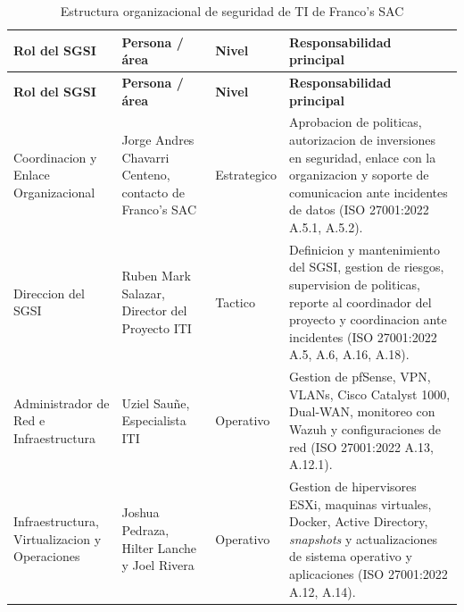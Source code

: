 \documentclass[11pt, a4paper, oneside]{report}
\begin{document}
\begin{xltabular}{\textwidth}{@{}|L{3.4cm}|L{2.6cm}|L{1.6cm}|X|@{}}
\caption{Estructura organizacional de seguridad de TI de Franco's SAC}
\label{tab:estructura_organizacional_sgsi} \\

\parbox[c][1.1cm][c]{\linewidth}{\centering\color{white}\bfseries\small Rol del SGSI} &
\parbox[c][1.1cm][c]{\linewidth}{\centering\color{white}\bfseries\small Persona / área} &
\parbox[c][1.1cm][c]{\linewidth}{\centering\color{white}\bfseries\small Nivel} &
\parbox[c][1.1cm][c]{\linewidth}{\centering\color{white}\bfseries\small Responsabilidad principal} \\ \hline
\endfirsthead

\parbox[c][1.1cm][c]{\linewidth}{\centering\color{white}\bfseries\small Rol del SGSI} &
\parbox[c][1.1cm][c]{\linewidth}{\centering\color{white}\bfseries\small Persona / área} &
\parbox[c][1.1cm][c]{\linewidth}{\centering\color{white}\bfseries\small Nivel} &
\parbox[c][1.1cm][c]{\linewidth}{\centering\color{white}\bfseries\small Responsabilidad principal} \\ \hline
\endhead

\hline
\endfoot

{\small Coordinacion y Enlace Organizacional} & {\small Jorge Andres Chavarri Centeno, contacto de Franco's SAC} & {\small Estrategico} & {\small Aprobacion de politicas, autorizacion de inversiones en seguridad, enlace con la organizacion y soporte de comunicacion ante incidentes de datos (ISO 27001:2022 A.5.1, A.5.2).} \\ \hline

{\small Direccion del SGSI} & {\small Ruben Mark Salazar, Director del Proyecto ITI} & {\small Tactico} & {\small Definicion y mantenimiento del SGSI, gestion de riesgos, supervision de politicas, reporte al coordinador del proyecto y coordinacion ante incidentes (ISO 27001:2022 A.5, A.6, A.16, A.18).} \\ \hline

{\small Administrador de Red e Infraestructura} & {\small Uziel Sauñe, Especialista ITI} & {\small Operativo} & {\small Gestion de pfSense, VPN, VLANs, Cisco Catalyst 1000, Dual-WAN, monitoreo con Wazuh y configuraciones de red (ISO 27001:2022 A.13, A.12.1).} \\ \hline

{\small Infraestructura, Virtualizacion y Operaciones} & {\small Joshua Pedraza, Hilter Lanche y Joel Rivera} & {\small Operativo} & {\small Gestion de hipervisores ESXi, maquinas virtuales, Docker, Active Directory, \textit{snapshots} y actualizaciones de sistema operativo y aplicaciones (ISO 27001:2022 A.12, A.14).} \\ \hline


\end{xltabular}
\end{document}
